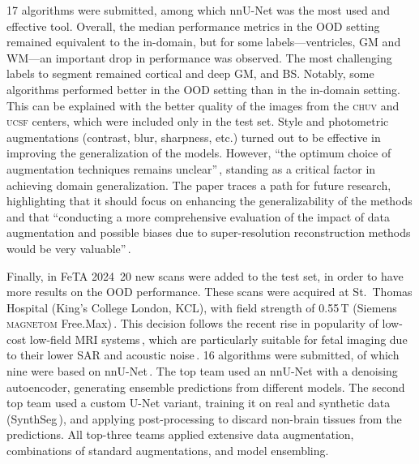 17 algorithms were submitted, among which nnU-Net was the most used and effective tool. Overall, the median performance metrics in the OOD setting remained equivalent to the in-domain, but for some labels---ventricles, GM and  WM---an important drop in performance was observed. The most challenging labels to segment remained cortical and deep GM, and BS. Notably, some algorithms performed better in the OOD setting than in the in-domain setting. This can be explained with the better quality of the images from the \textsc{chuv} and \textsc{ucsf} centers, which were included only in the test set. Style and photometric augmentations (contrast, blur, sharpness, etc.) turned out to be effective in improving the generalization of the models. However, \enquote{the optimum choice of augmentation techniques remains unclear}\,\cite{FeTA2022_review}, standing as a critical factor in achieving domain generalization. The paper traces a path for future research, highlighting that it should focus on enhancing the generalizability of the methods and that \enquote{conducting a more comprehensive evaluation of the impact of data augmentation and possible biases due to super-resolution reconstruction methods would be very valuable}\,\cite{FeTA2022_review}.

Finally, in FeTA 2024\,\cite{FeTA2024_review, FeTA2024} 20 new scans were added to the test set, in order to have more results on the OOD performance. These scans were acquired at St.\ Thomas Hospital (King's College London, KCL), with field strength of 0.55\,T (Siemens \textsc{magnetom} Free.Max)\,\cite{FeTA2024_paper}. This decision follows the recent rise in popularity of low-cost low-field MRI systems\,\cite{Aviles2023}, which are particularly suitable for fetal imaging due to their lower SAR and acoustic noise\,\cite{Ponrartana2023}. 16 algorithms were submitted, of which nine were based on nnU-Net\,\cite{nnUNet, Isensee2021}. The top team used an nnU-Net with a denoising autoencoder, generating ensemble predictions from different models. The second top team used a custom U-Net variant, training it on real and synthetic data (SynthSeg\,\cite{Billot2023}), and applying post-processing to discard non-brain tissues from the predictions. All top-three teams applied extensive data augmentation, combinations of standard augmentations, and model ensembling.

